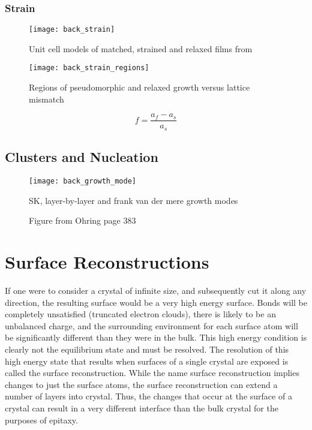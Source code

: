 \subsubsection{Strain}
\begin{figure}
    \centering
    \texttt{[image: back\_strain]}
    \caption{\label{fig:back_strain}Unit cell models of matched, strained and relaxed films from \cite{ohring2001materials}}
\end{figure}
\begin{figure}
    \centering
    \texttt{[image: back\_strain\_regions]}
    \caption{\label{fig:back_strain_regions}Regions of pseudomorphic and relaxed growth versus lattice mismatch\cite{Bean1986}}
\end{figure}
\begin{equation}
f = \frac{a_f - a_s}{a_s} \label{eqn:strain}
\end{equation}


\subsection{Clusters and Nucleation}
\begin{figure}
    \centering
    \texttt{[image: back\_growth\_mode]}
    \caption{\label{fig:back_growth_mode}SK, layer-by-layer and frank van der mere growth modes\cite{ohring2001materials}}
\end{figure}

\begin{figure}
    \centering
    \caption{\label{fig:back_nucleation_regions}Figure from Ohring page 383}
\end{figure}

\section{Surface Reconstructions} 
If one were to consider a crystal of infinite size, and subsequently cut it along any direction, the resulting surface would be a very high energy surface. Bonds will be completely unsatisfied (truncated electron clouds), there is likely to be an unbalanced charge, and the surrounding environment for each surface atom will be significantly different than they were in the bulk. This high energy condition is clearly not the equilibrium state and must be resolved. The resolution of this high energy state that results when surfaces of a single crystal are exposed is called the surface reconstruction. While the name surface reconstruction implies changes to just the surface atoms, the surface reconstruction can extend a number of layers into crystal. Thus, the changes that occur at the surface of a crystal can result in a very different interface than the bulk crystal for the purposes of epitaxy.

